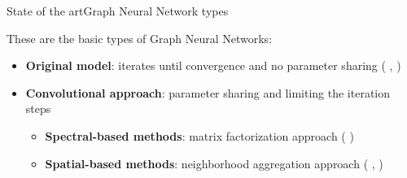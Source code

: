 \documentclass[xcolor=table]{beamer}
\begin{document}
\begin{frame}{State of the art}{Graph Neural Network types}

These are the basic types of Graph Neural Networks:


\begin{itemize}
    \item \textbf{Original model}: iterates until convergence and no parameter sharing ( \citet{gori} , \citet{scarcelli}  )
    \item \textbf{Convolutional approach}: parameter sharing and limiting the iteration steps
        \begin{itemize}
            \item \textbf{Spectral-based methods}: matrix factorization approach (\citet{bruna}  )
            \item \textbf{Spatial-based methods}: neighborhood aggregation approach (\citet{gcn} , \citet{graphsage} )
        \end{itemize}
\end{itemize}
\end{frame}





\end{document}
